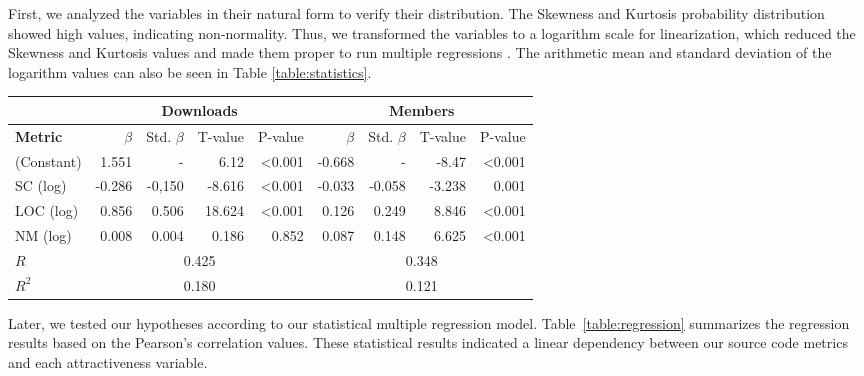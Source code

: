 \documentclass[conference]{IEEEtran}
\begin{document}
First, we analyzed the variables in their natural form to verify their
distribution.
%
The Skewness and Kurtosis probability distribution showed high values, indicating non-normality. Thus,
we transformed the variables to a logarithm scale for linearization,
which reduced the Skewness and Kurtosis values and made them proper to run multiple regressions \cite{Crowston2002}.
%
The arithmetic mean and standard deviation of the logarithm values can also be seen
in Table \ref{table:statistics}.

\begin{center}
\begin{table*}[hbt]
\centering \caption{Equations and Pearson Correlations}
\begin{tabular}{|l|r|r|r|r|r|r|r|r|} \hline

& \multicolumn{4}{|c|}{Downloads} & \multicolumn{4}{|c|}{Members}\\ \hline
  
\textbf{Metric} & $\beta$ & Std. $\beta$ & T-value & P-value & $\beta$ & Std. $\beta$ & T-value & P-value
\\ \hline
(Constant) & 1.551 & - & 6.12 & \textless 0.001 & -0.668 & - & -8.47 & \textless 0.001
\\ \hline
SC (log) & -0.286 & -0,150 & -8.616 & \textless 0.001 & -0.033 & -0.058 & -3.238 & 0.001
\\ \hline
LOC (log) & 0.856 & 0.506 & 18.624 & \textless 0.001 & 0.126 & 0.249 & 8.846 & \textless 0.001
\\ \hline
NM (log) & 0.008 & 0.004 & 0.186 & 0.852 & 0.087 & 0.148 & 6.625 & \textless 0.001
\\ \hline
   \hline
$R$ & \multicolumn{4}{|c|}{0.425} & \multicolumn{4}{|c|}{0.348}\\ \hline
$R^2$ & \multicolumn{4}{|c|}{0.180} & \multicolumn{4}{|c|}{0.121}\\ \hline
\end{tabular}
\label{table:regression}
\end{table*}
\end{center}

Later, we tested our hypotheses according to our statistical multiple regression model.
%
Table~\ref{table:regression} summarizes the regression results based on the Pearson's correlation values.
%
These statistical results indicated a linear dependency between our
source code metrics and each attractiveness variable.
\end{document}
